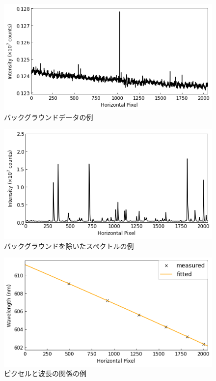 \begin{figure}
    \centering
    \includegraphics[width=15cm]{pictures/back-spectrum-example.png}
    \caption{バックグラウンドデータの例}
    \label{fig:back-spectrum-example}
\end{figure}

\begin{figure}
    \centering
    \includegraphics[width=15cm]{pictures/true-spectrum-example.png}
    \caption{バックグラウンドを除いたスペクトルの例}
    \label{fig:true-spectrum-example}
\end{figure}

\begin{figure}
    \centering
    \includegraphics[width=15cm]{pictures/pixel-to-wavelength.png}
    \caption{ピクセルと波長の関係の例}
    \label{fig:pixel-to-wavelength}
\end{figure}

